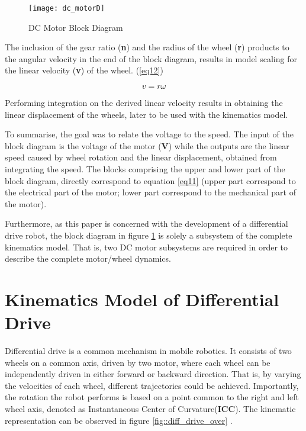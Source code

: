 \begin{figure}[h]
\centering
\texttt{[image: dc\_motorD]}
\caption{DC Motor Block Diagram}
\label{fig::dcmfigure}
\end{figure}

The inclusion of the gear ratio (\textbf{n}) and the radius of the wheel (\textbf{r}) products to the angular velocity in the end of the block diagram, results in model scaling for the linear velocity (\textbf{v}) of the wheel. (\ref{eq12})

\begin{equation} \label{eq12}
v = r\omega
\end{equation}

Performing integration on the derived linear velocity results in obtaining the linear displacement of the wheels, later to be used with the kinematics model. 

To summarise, the goal was to relate the voltage to the speed. The input of the block diagram is the voltage of the motor (\textbf{V}) while the outputs are the linear speed caused by wheel rotation and the linear displacement, obtained from integrating the speed. The blocks comprising the upper and lower part of the block diagram, directly correspond to equation \ref{eq11} (upper part correspond to the electrical part of the motor; lower part correspond to the mechanical part of the motor).

Furthermore, as this paper is concerned with the development of a differential drive robot, the block diagram in figure \ref{fig::dcmfigure} is solely a subsystem of the complete kinematics model. That is, two DC motor subsystems are required in order to describe the complete motor/wheel dynamics. 

\section{Kinematics Model of Differential Drive}

Differential drive is a common mechanism in mobile robotics. It consists of two wheels on a common axis, driven by two motor, where each wheel can be independently driven in either forward or backward direction. That is, by varying the velocities of each wheel, different  trajectories could be achieved. Importantly, the rotation the robot performs is based on a point common to the right and left wheel axis, denoted as Instantaneous Center of Curvature(\textbf{ICC}). The kinematic representation can be observed in figure \ref{fig::diff_drive_over} .

